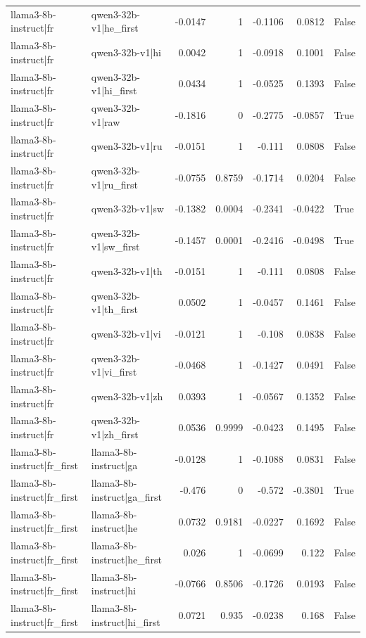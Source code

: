\begin{table}
\begin{tabular}{l l r r r r l}
llama3-8b-instruct|fr & qwen3-32b-v1|he_first & -0.0147 & 1 & -0.1106 & 0.0812 & False \\
llama3-8b-instruct|fr & qwen3-32b-v1|hi & 0.0042 & 1 & -0.0918 & 0.1001 & False \\
llama3-8b-instruct|fr & qwen3-32b-v1|hi_first & 0.0434 & 1 & -0.0525 & 0.1393 & False \\
llama3-8b-instruct|fr & qwen3-32b-v1|raw & -0.1816 & 0 & -0.2775 & -0.0857 & True \\
llama3-8b-instruct|fr & qwen3-32b-v1|ru & -0.0151 & 1 & -0.111 & 0.0808 & False \\
llama3-8b-instruct|fr & qwen3-32b-v1|ru_first & -0.0755 & 0.8759 & -0.1714 & 0.0204 & False \\
llama3-8b-instruct|fr & qwen3-32b-v1|sw & -0.1382 & 0.0004 & -0.2341 & -0.0422 & True \\
llama3-8b-instruct|fr & qwen3-32b-v1|sw_first & -0.1457 & 0.0001 & -0.2416 & -0.0498 & True \\
llama3-8b-instruct|fr & qwen3-32b-v1|th & -0.0151 & 1 & -0.111 & 0.0808 & False \\
llama3-8b-instruct|fr & qwen3-32b-v1|th_first & 0.0502 & 1 & -0.0457 & 0.1461 & False \\
llama3-8b-instruct|fr & qwen3-32b-v1|vi & -0.0121 & 1 & -0.108 & 0.0838 & False \\
llama3-8b-instruct|fr & qwen3-32b-v1|vi_first & -0.0468 & 1 & -0.1427 & 0.0491 & False \\
llama3-8b-instruct|fr & qwen3-32b-v1|zh & 0.0393 & 1 & -0.0567 & 0.1352 & False \\
llama3-8b-instruct|fr & qwen3-32b-v1|zh_first & 0.0536 & 0.9999 & -0.0423 & 0.1495 & False \\
llama3-8b-instruct|fr_first & llama3-8b-instruct|ga & -0.0128 & 1 & -0.1088 & 0.0831 & False \\
llama3-8b-instruct|fr_first & llama3-8b-instruct|ga_first & -0.476 & 0 & -0.572 & -0.3801 & True \\
llama3-8b-instruct|fr_first & llama3-8b-instruct|he & 0.0732 & 0.9181 & -0.0227 & 0.1692 & False \\
llama3-8b-instruct|fr_first & llama3-8b-instruct|he_first & 0.026 & 1 & -0.0699 & 0.122 & False \\
llama3-8b-instruct|fr_first & llama3-8b-instruct|hi & -0.0766 & 0.8506 & -0.1726 & 0.0193 & False \\
llama3-8b-instruct|fr_first & llama3-8b-instruct|hi_first & 0.0721 & 0.935 & -0.0238 & 0.168 & False \\

\end{tabular}
\end{table}
